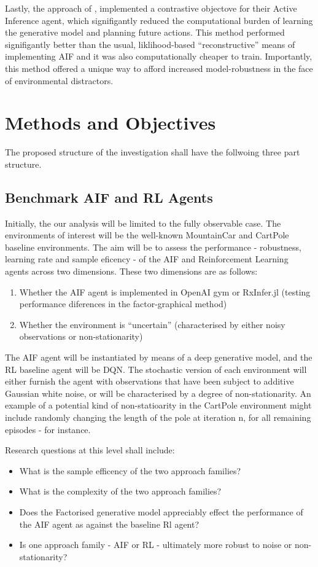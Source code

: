 \documentclass[12pt, twoside]{report}
\begin{document}
Lastly, the approach of \textcite{Contrastive-AIF}, implemented a contrastive objectove for their Active Inference agent, which signifigantly reduced the computational burden of learning the generative model and planning future actions. This method performed signifigantly better than the usual, liklihood-based ``reconstructive'' means of implementing AIF and it was also computationally cheaper to train. Importantly, this method offered a unique way to afford increased model-robustness in the face of environmental distractors. 


\section{Methods and Objectives}
The proposed structure of the investigation shall have the follwoing three part structure. 

\subsection{Benchmark AIF and RL Agents}
Initially, the our analysis will be limited to the fully observable case. The environments of interest will be the well-known MountainCar and CartPole baseline environments. The aim will be to assess the performance - robustness, learning rate and sample eficency - of the AIF and Reinforcement Learning agents across two dimensions. These two dimensions are as follows:
\begin{enumerate}
\item Whether the AIF agent is implemented in OpenAI gym or RxInfer.jl (testing performance diferences in the factor-graphical method)
\item Whether the environment is ``uncertain'' (characterised by either noisy observations or non-stationarity)
\end{enumerate}

The AIF agent will be instantiated by means of a deep generative model, and the RL baseline agent will be DQN. The stochastic version of each environment will either furnish the agent with observations that have been subject to additive Gaussian white noise, or will be characterised by a degree of non-stationarity. An example of a potential kind of non-statioarity in the CartPole environment might include randomly changing the length of the pole at iteration n, for all remaining episodes - for instance.  

Research questions at this level shall include:
\begin{itemize}
\item What is the sample efficency of the two approach families?
\item What is the complexity of the two approach families?
\item Does the Factorised generative model appreciably effect the performance of the AIF agent as against the baseline Rl agent?
\item Is one approach family - AIF or RL - ultimately more robust to noise or non-stationarity?
\end{itemize}  
   
\end{document}
